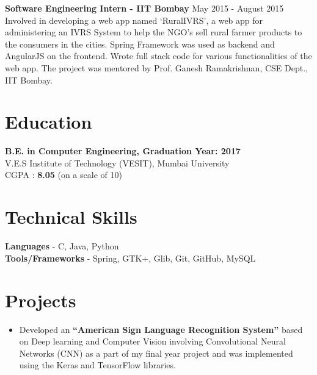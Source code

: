 \documentclass[11pt,margin, centered]{res}
\begin{document}
\begin{resume}
\vspace{2mm}

\textbf{Software Engineering Intern - IIT Bombay} \hfill May 2015 - August 2015\\
Involved in developing a web app named ‘RuralIVRS’, a web app for administering an IVRS System to help the NGO's sell rural farmer products to the consumers in the cities. Spring Framework was used as backend and AngularJS on the frontend. Wrote full stack code for various functionalities of the web app. The project was mentored by Prof. Ganesh Ramakrishnan, CSE Dept., IIT Bombay.



\section{Education}
\vspace{8mm}
\textbf{B.E. in Computer Engineering, Graduation Year: 2017} \\
V.E.S Institute of Technology (VESIT), Mumbai University \\
CGPA : \textbf{8.05} (on a scale of 10)

\section{Technical \hspace{2mm} Skills}
\vspace{8mm}
\textbf{Languages} - C, Java, Python \\
\textbf{Tools/Frameworks} - Spring, GTK+, Glib, Git, GitHub, MySQL

\section{Projects}
\vspace{10mm}
\begin{itemize}[leftmargin=*]
 \item Developed an \textbf{``American Sign Language Recognition System''} based on Deep learning and Computer Vision involving Convolutional Neural Networks (CNN) as a part of my final year project and was implemented using the Keras and TensorFlow libraries.
\end{itemize}


\end{resume}
\end{document}
